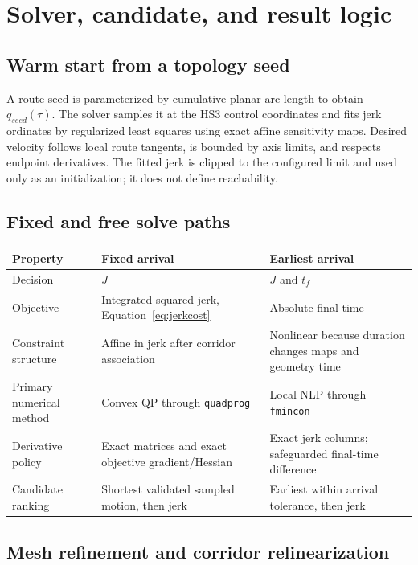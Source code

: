 \documentclass[10pt,letterpaper]{article}
\newcommand{\file}[1]{\nolinkurl{#1}}
\begin{document}
\section{Solver, candidate, and result logic}

\subsection{Warm start from a topology seed}

A route seed is parameterized by cumulative planar arc length to obtain
$q_{seed}(\tau)$. The solver samples it at the HS3 control coordinates and
fits jerk ordinates by regularized least squares using exact affine sensitivity
maps. Desired velocity follows local route tangents, is bounded by axis limits,
and respects endpoint derivatives. The fitted jerk is clipped to the configured
limit and used only as an initialization; it does not define reachability.

\subsection{Fixed and free solve paths}

\begin{longtable}{@{}p{.19\linewidth}p{.38\linewidth}p{.37\linewidth}@{}}
\toprule
Property & Fixed arrival & Earliest arrival \\
\midrule
\endhead
Decision & $J$ & $J$ and $t_f$ \\
Objective & Integrated squared jerk, Equation~\eqref{eq:jerkcost} & Absolute final time \\
Constraint structure & Affine in jerk after corridor association & Nonlinear because duration changes maps and geometry time \\
Primary numerical method & Convex QP through \file{quadprog} & Local NLP through \file{fmincon} \\
Derivative policy & Exact matrices and exact objective gradient/Hessian & Exact jerk columns; safeguarded final-time difference \\
Candidate ranking & Shortest validated sampled motion, then jerk & Earliest within arrival tolerance, then jerk \\
\bottomrule
\end{longtable}

\subsection{Mesh refinement and corridor relinearization}
\end{document}
